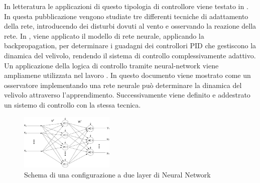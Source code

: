 In letteratura le applicazioni di questo tipologia di controllore viene testato in \cite{4564736}. In questa pubblicazione vengono studiate tre differenti tecniche di adattamento della rete, introducendo dei disturbi dovuti al vento e osservando la reazione della rete. In \cite{8287305}, viene applicato il modello di rete neurale, applicando la backpropagation, per determinare i guadagni dei controllori PID che gestiscono la dinamica del velivolo, rendendo il sistema di controllo complessivamente adattivo. Un applicazione della logica di controllo tramite neural-network viene ampliamene utilizzata nel lavoro \cite{5345702}. In questo documento viene mostrato come un osservatore implementando una rete neurale può determinare la dinamica del velivolo attraverso l'apprendimento. Successivamente viene definito e addestrato un sistemo di controllo con la stessa tecnica.

\begin{figure}
	\centering
	\includegraphics[width=0.4\textwidth]{SistemaQuadrirotore/Figure/NN_Struttura}
	\caption{Schema di una configurazione a due layer di Neural Network}
	\label{fig:NN}
\end{figure}

